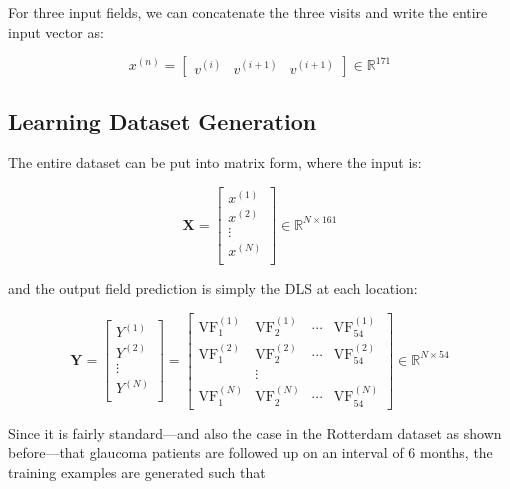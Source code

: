 For three input fields, we can concatenate the three visits and write the entire input vector as: 

\begin{equation}
x^{(n)} = \begin{bmatrix}
v^{(i)} & v^{(i+1)} & v^{(i+1)}
\end{bmatrix}
\in \mathbb{R}^{171}
\end{equation}

\subsection{Learning Dataset Generation} \label{sec:datasetgeneration}

The entire dataset can be put into matrix form, where the input is:

\begin{equation}
\mathbf{X} = \begin{bmatrix}
x^{(1)} \\
x^{(2)} \\
\vdots \\
x^{(N)} \\
\end{bmatrix}
\in \mathbb{R}^{N\times 161}
\end{equation}

and the output field prediction is simply the \ac{DLS} at each location:

\begin{equation}
\mathbf{Y} = \begin{bmatrix}
Y^{(1)} \\
Y^{(2)} \\
\vdots \\
Y^{(N)} \\
\end{bmatrix}
= \begin{bmatrix}
\textrm{VF}_1^{(1)} & \textrm{VF}_2^{(1)} & \cdots & \textrm{VF}_{54}^{(1)} \\
\textrm{VF}_1^{(2)} & \textrm{VF}_2^{(2)} & \cdots & \textrm{VF}_{54}^{(2)} \\
& \vdots & & \\
\textrm{VF}_1^{(N)} & \textrm{VF}_2^{(N)} & \cdots & \textrm{VF}_{54}^{(N)}
\end{bmatrix}
\in \mathbb{R}^{N\times 54}
\end{equation}

Since it is fairly standard---and also the case in the Rotterdam dataset as shown before---that glaucoma patients are followed up on an interval of 6 months, the training examples are generated such that

